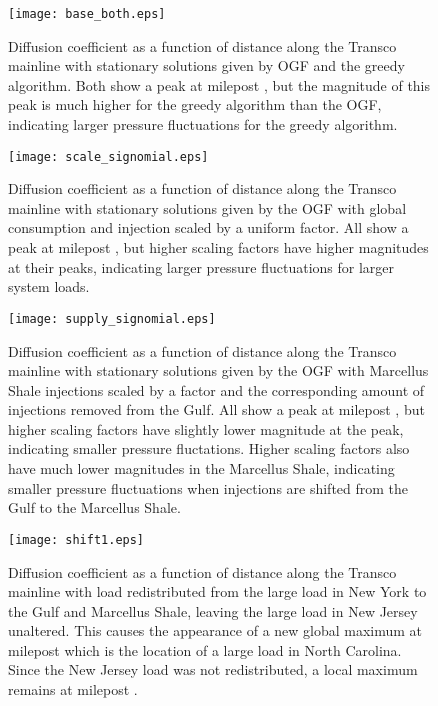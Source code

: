 \documentclass[10pt, conference, compsocconf]{IEEEtran}
\begin{document}
\begin{figure}
\centering
\texttt{[image: base\_both.eps]}
\caption{Diffusion coefficient as a function of distance along the Transco
mainline with stationary solutions given by OGF and the
greedy algorithm.  Both show a peak at milepost , but the magnitude
of this peak is much higher for the greedy algorithm than the OGF, indicating larger pressure fluctuations for the greedy algorithm.
}
\label{BBoth}
\end{figure}

\begin{figure}
\centering
\texttt{[image: scale\_signomial.eps]}
\caption{Diffusion coefficient as a function of distance along the Transco
mainline with stationary solutions given by the OGF with
global consumption and injection scaled by a uniform factor.
All show a peak at milepost , but higher scaling factors have higher
magnitudes at their peaks, indicating larger pressure fluctuations for larger
system loads.
}
\label{SSig}
\end{figure}



\begin{figure}
\centering
\texttt{[image: supply\_signomial.eps]}
\caption{Diffusion coefficient as a function of distance along the Transco
mainline with stationary solutions given by the OGF with
Marcellus Shale injections scaled by a factor and the corresponding amount
of injections removed from the Gulf.  All show a peak at milepost , but
higher scaling factors have slightly lower magnitude at the peak, indicating
smaller pressure fluctations.
Higher scaling factors also have much lower magnitudes in the Marcellus
Shale, indicating smaller pressure fluctuations when injections are shifted
from the Gulf to the Marcellus Shale.
}
\label{SuSig}
\end{figure}



\begin{figure}
\centering
\texttt{[image: shift1.eps]}
\caption{Diffusion coefficient as a function of distance along the Transco
mainline with load redistributed from the large load in New York to
the Gulf and Marcellus Shale, leaving the large load in New Jersey unaltered.
This causes the appearance of a new global maximum at milepost 
which is the location of a large load in North Carolina.
Since the New Jersey load was not redistributed, a local maximum remains
at milepost .
}
\label{shift1}
\end{figure}
\end{document}
